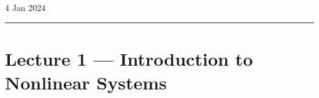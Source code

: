 \hfill\small{4 Jan 2024}
\vspace{0.5em}
\hrule
\vspace{-0.5em}
\section{Lecture 1 --- Introduction to Nonlinear Systems}